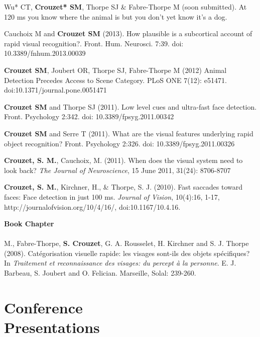 \documentclass[margin,line]{resume}
\begin{document}
\begin{resume}
	\vspace{-2mm} Wu* CT, \textbf{Crouzet* SM}, Thorpe SJ \& Fabre-Thorpe M (soon submitted). At 120 ms you know where the animal is but you don’t yet know it’s a dog.
	
	\vspace{-2mm} Cauchoix M and \textbf{Crouzet SM} (2013). How plausible is a subcortical account of rapid visual recognition?. Front. Hum. Neurosci. 7:39. doi: 10.3389/fnhum.2013.00039
	
	\vspace{-2mm} \textbf{Crouzet SM}, Joubert OR, Thorpe SJ, Fabre-Thorpe M (2012) Animal Detection Precedes Access to Scene Category. PLoS ONE 7(12): e51471. doi:10.1371/journal.pone.0051471

	\vspace{-2mm} \textbf{Crouzet SM} and Thorpe SJ (2011). Low level cues and ultra-fast face detection. Front. Psychology 2:342. doi: 10.3389/fpsyg.2011.00342

	\vspace{-2mm} \textbf{Crouzet SM} and Serre T (2011). What are the visual features underlying rapid object recognition? Front. Psychology 2:326. doi: 10.3389/fpsyg.2011.00326

	\vspace{-2mm} \textbf{Crouzet, S. M.}, Cauchoix, M. (2011). When does the visual system need to look back?  \textit{The Journal of Neuroscience}, 15 June 2011, 31(24): 8706-8707

	\vspace{-2mm} \textbf{Crouzet, S. M.}, Kirchner, H., \& Thorpe, S. J.  (2010). Fast saccades toward faces: Face detection in just 100 ms. \textit{Journal of Vision}, 10(4):16, 1-17, http://journalofvision.org/10/4/16/, doi:10.1167/10.4.16.

\newpage

	\vspace{3mm}	
	\textbf{Book Chapter}\\\\
	M., Fabre-Thorpe, \textbf{S. Crouzet}, G. A. Rousselet, H. Kirchner and S. J. Thorpe (2008). Catégorisation visuelle rapide: les visages sont-ils des 	objets spécifiques? In \textsl{Traitement et reconnaissance des visages: du percept \`a la personne}. E. J. Barbeau, S. Joubert and O. Felician. Marseille, Solal: 239-260.


\vspace{3mm}	
    \section{\mysidestyle Conference\\Presentations}


\end{resume}
\end{document}
